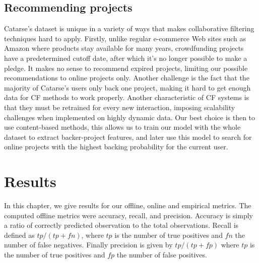 \documentclass[cic,tc,english]{iiufrgs}
\begin{document}
\section{Recommending projects}
Catarse's dataset is unique in a variety of ways that makes collaborative filtering techniques hard to apply. Firstly, unlike regular e-commerce Web sites such as Amazon where products stay available for many years, crowdfunding projects have a predetermined cutoff date, after which it's no longer possible to make a pledge. It makes no sense to recommend expired projects, limiting our possible recommendations to online projects only. Another challenge is the fact that the majority of Catarse's users only back one project, making it hard to get enough data for CF methods to work properly. Another characteristic of CF systems is that they must be retrained for every new interaction, imposing scalability challenges when implemented on highly dynamic data. Our best choice is then to use content-based methods, this allows us to train our model with the whole dataset to extract backer-project features, and later use this model to search for online projects with the highest backing probability for the current user.




\chapter{Results}
In this chapter, we give results for our offline, online and empirical metrics. The computed offline metrics were accuracy, recall, and precision. Accuracy is simply a ratio of correctly predicted observation to the total observations. Recall is defined as $tp / (tp + fn)$, where $tp$ is the number of true positives and $fn$ the number of false negatives. Finally precision is given by $tp / (tp + fp)$ where $tp$ is the number of true positives and $fp$ the number of false positives.
\end{document}
